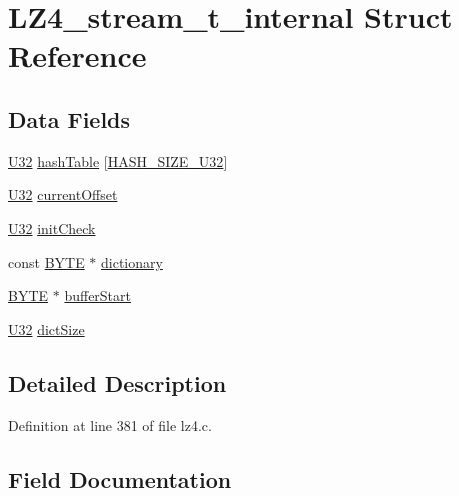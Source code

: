 \hypertarget{structLZ4__stream__t__internal}{}\section{L\+Z4\+\_\+stream\+\_\+t\+\_\+internal Struct Reference}
\label{structLZ4__stream__t__internal}
\subsection*{Data Fields}
\begin{DoxyCompactItemize}
\item 
\hyperlink{lz4_8c_ac3df7cf3c8cb172a588adec881447d68}{U32} \hyperlink{structLZ4__stream__t__internal_a81762be862caad87455554f2d39d4a29}{hash\+Table} \mbox{[}\hyperlink{lz4_8c_a10355a0f2e4e7f206a362ffa2272ec22}{H\+A\+S\+H\+\_\+\+S\+I\+Z\+E\+\_\+\+U32}\mbox{]}
\item 
\hyperlink{lz4_8c_ac3df7cf3c8cb172a588adec881447d68}{U32} \hyperlink{structLZ4__stream__t__internal_a2cdbcab32d03f345fd3c37af43c45523}{current\+Offset}
\item 
\hyperlink{lz4_8c_ac3df7cf3c8cb172a588adec881447d68}{U32} \hyperlink{structLZ4__stream__t__internal_a210c641599a4633cbf4e590cbc7a0a58}{init\+Check}
\item 
const \hyperlink{lz4_8c_a4ae1dab0fb4b072a66584546209e7d58}{B\+Y\+TE} $\ast$ \hyperlink{structLZ4__stream__t__internal_aea78f571ae3100b95df66b1d39c48aee}{dictionary}
\item 
\hyperlink{lz4_8c_a4ae1dab0fb4b072a66584546209e7d58}{B\+Y\+TE} $\ast$ \hyperlink{structLZ4__stream__t__internal_ae97c8d0df5e183aaba780e69655f923e}{buffer\+Start}
\item 
\hyperlink{lz4_8c_ac3df7cf3c8cb172a588adec881447d68}{U32} \hyperlink{structLZ4__stream__t__internal_a39e9e581f2a3c904bb1a912fd1611e72}{dict\+Size}
\end{DoxyCompactItemize}


\subsection{Detailed Description}


Definition at line 381 of file lz4.\+c.



\subsection{Field Documentation}
\mbox{\label{structLZ4__stream__t__internal_ae97c8d0df5e183aaba780e69655f923e}} 
